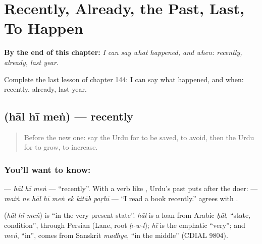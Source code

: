 
\chapter{Recently, Already, the Past, Last, To Happen}
\label{ch:ur-recently-already-the-past-last-to-happen}

\begin{chapteropening}
\textbf{By the end of this chapter:} \emph{I can say what happened, and when: recently, already, last year.}

Complete the last lesson of chapter 144: I can say what happened, and when: recently, already, last year.
\end{chapteropening}

\section[\texorpdfstring{\ur{حال} \ur{ہی} \ur{میں} (hāl hī meṅ)}{حال ہی میں (hāl hī meṅ)}]{   (hāl hī meṅ) — recently}

\label{lesson:UR-C144-hal-hi-mein}



\begin{quote}
Before the new one: say the Urdu for to be saved, to avoid, then the Urdu for to grow, to increase.
\end{quote}

\subsection*{You'll want to know:   }
\textbf{  } — \emph{hāl hī meṅ} — \textquotedblleft{}recently\textquotedblright{}. With a verb like \textbf{}, Urdu's past puts \textbf{} after the doer: \textbf{       } — \emph{maiṅ ne hāl hī meṅ ek kitāb paṛhī} — \textquotedblleft{}I read a book recently.\textquotedblright{} \textbf{} agrees with \textbf{}.

\begin{cousinweb}
\textbf{  } (\emph{hāl hī meṅ}) is \textquotedblleft{}in the very present state\textquotedblright{}. \emph{hāl} is a loan from Arabic \emph{ḥāl}, \textquotedblleft{}state, condition\textquotedblright{}, through Persian (Lane, root \emph{ḥ-w-l}); \emph{hī} is the emphatic \textquotedblleft{}very\textquotedblright{}; and \emph{meṅ}, \textquotedblleft{}in\textquotedblright{}, comes from Sanskrit \emph{madhye}, \textquotedblleft{}in the middle\textquotedblright{} (CDIAL 9804).
\end{cousinweb}

